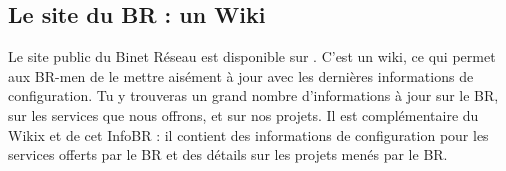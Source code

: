 
\subsection{Le site du BR : un Wiki}
\label{siteBR}

Le site public du Binet Réseau est disponible sur . C'est un wiki, ce qui permet aux BR-men de le mettre aisément
à jour avec les dernières informations de configuration.
Tu y trouveras un grand nombre d'informations à jour sur le BR, sur les services que nous offrons, et sur nos projets.
Il est complémentaire du Wikix et de cet InfoBR : il contient des informations de configuration pour les services offerts par le
BR et des détails sur les projets menés par le BR.
